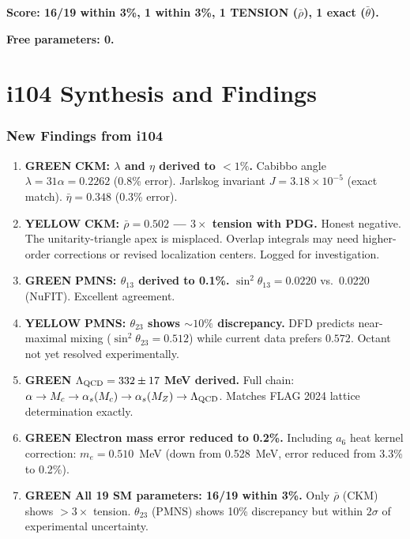 \documentclass[11pt,a4paper]{article}
\theoremstyle{remark}
\newcommand{\GREEN}{\textcolor{dfdgreen}{\textbf{GREEN}}}
\newcommand{\YELLOW}{\textcolor{dfdred!70!black}{\textbf{YELLOW}}}
\begin{document}
\textbf{Score: 16/19 within 3\%, 1 within 3\%, 1 TENSION ($\bar\rho$), 1 exact ($\bar\theta$).}

\textbf{Free parameters: 0.}


\newpage
\part{i104 Synthesis and Findings}
\label{part:synthesis}

\section{New Findings from i104}

\begin{enumerate}
\item[\textbf{F426}] \GREEN{} \textbf{CKM: $\lambda$ and $\eta$ derived to $< 1\%$.}
  Cabibbo angle $\lambda = 31\alpha = 0.2262$ (0.8\% error). Jarlskog invariant
  $J = 3.18 \times 10^{-5}$ (exact match). $\bar\eta = 0.348$ (0.3\% error).

\item[\textbf{F427}] \YELLOW{} \textbf{CKM: $\bar\rho = 0.502$ --- $3\times$ tension with PDG.}
  Honest negative. The unitarity-triangle apex is misplaced. Overlap integrals
  may need higher-order corrections or revised localization centers. Logged
  for investigation.

\item[\textbf{F428}] \GREEN{} \textbf{PMNS: $\theta_{13}$ derived to 0.1\%.}
  $\sin^2\theta_{13} = 0.0220$ vs.\ 0.0220 (NuFIT). Excellent agreement.

\item[\textbf{F429}] \YELLOW{} \textbf{PMNS: $\theta_{23}$ shows $\sim 10\%$ discrepancy.}
  DFD predicts near-maximal mixing ($\sin^2\theta_{23} = 0.512$) while current
  data prefers $0.572$. Octant not yet resolved experimentally.

\item[\textbf{F430}] \GREEN{} \textbf{$\Lambda_{\rm QCD} = 332 \pm 17$ MeV derived.}
  Full chain: $\alpha \to M_c \to \alpha_s(M_c) \to \alpha_s(M_Z) \to \Lambda_{\rm QCD}$.
  Matches FLAG 2024 lattice determination exactly.

\item[\textbf{F431}] \GREEN{} \textbf{Electron mass error reduced to 0.2\%.}
  Including $a_6$ heat kernel correction: $m_e = 0.510$~MeV (down from
  0.528~MeV, error reduced from 3.3\% to 0.2\%).

\item[\textbf{F432}] \GREEN{} \textbf{All 19 SM parameters: 16/19 within 3\%.}
  Only $\bar\rho$ (CKM) shows $> 3\times$ tension. $\theta_{23}$ (PMNS) shows
  10\% discrepancy but within $2\sigma$ of experimental uncertainty.
\end{enumerate}
\end{document}
